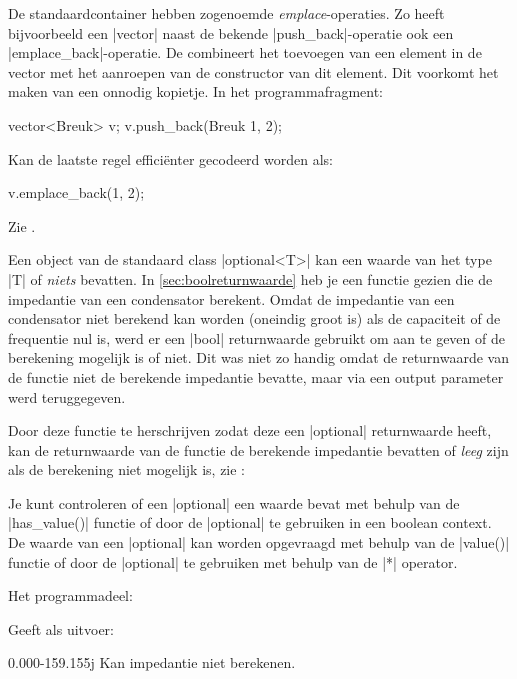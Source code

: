 \begin{cpplstShortInline}
De standaardcontainer hebben zogenoemde \emph{emplace}-operaties.
Zo heeft bijvoorbeeld een |vector| naast de bekende |push_back|-operatie ook een |emplace_back|-operatie.
De  combineert het toevoegen van een element in de vector met het aanroepen van de constructor van dit element.
Dit voorkomt het maken van een onnodig kopietje.
In het programmafragment:
\begin{cpplstfragment}
	vector<Breuk> v;
	v.push_back(Breuk {1, 2});
\end{cpplstfragment}
Kan de laatste regel efficiënter gecodeerd worden als:
\begin{cpplstfragment}
	v.emplace_back(1, 2);
\end{cpplstfragment}
Zie .

\label{sec:optional}
Een object van de standaard class |optional<T>| kan een waarde van het type |T| of \emph{niets} bevatten.
In \cref{sec:boolreturnwaarde} heb je een functie gezien die de impedantie van een condensator berekent.
Omdat de impedantie van een condensator niet berekend kan worden (oneindig groot is) als de capaciteit of de frequentie nul is, werd er een |bool| returnwaarde gebruikt om aan te geven of de berekening mogelijk is of niet.
Dit was niet zo handig omdat de returnwaarde van de functie niet de berekende impedantie bevatte, maar via een output parameter werd teruggegeven.

Door deze functie te herschrijven zodat deze een |optional| returnwaarde heeft, kan de returnwaarde van de functie de berekende impedantie bevatten of \emph{leeg} zijn
als de berekening niet mogelijk is, zie :

Je kunt controleren of een |optional| een waarde bevat met behulp van de |has_value()| functie of door de |optional| te gebruiken in een boolean context.
De waarde van een |optional| kan worden opgevraagd met behulp van de |value()| functie of door de |optional| te gebruiken met behulp van de |*| operator.

Het programmadeel:

Geeft als uitvoer:
\begin{coutput}
0.000-159.155j
Kan impedantie niet berekenen.
\end{coutput}


\end{cpplstShortInline}
